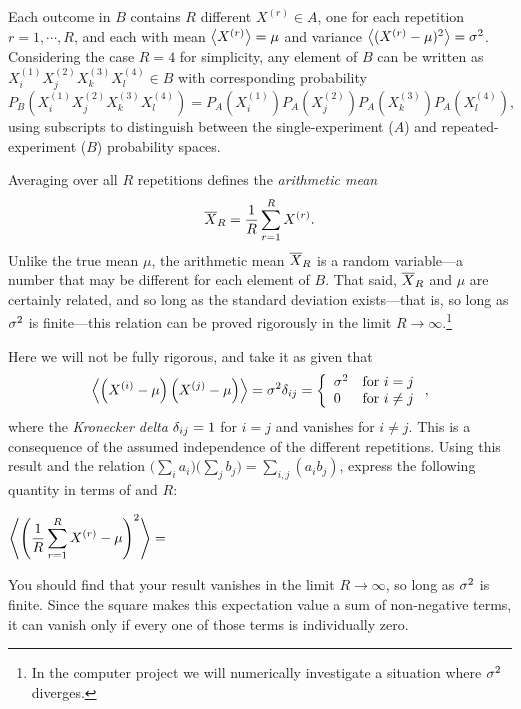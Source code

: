 Each outcome in $B$ contains $R$ different $X^{(r)} \in A$, one for each repetition $r = 1, \cdots, R$, and each with mean $\left\langle X^{(r)} \right\rangle = \mu$ and variance $\left\langle (X^{(r)} - \mu)^2 \right\rangle = \sigma^2$.
Considering the case $R = 4$ for simplicity, any element of $B$ can be written as $X_i^{(1)} X_j^{(2)} X_k^{(3)} X_l^{(4)} \in B$ with corresponding probability
\begin{equation*}
  P_B\left(X_i^{(1)} X_j^{(2)} X_k^{(3)} X_l^{(4)}\right) = P_A\left(X_i^{(1)}\right) P_A\left(X_j^{(2)}\right) P_A\left(X_k^{(3)}\right) P_A\left(X_l^{(4)}\right),
\end{equation*}
using subscripts to distinguish between the single-experiment ($A$) and repeated-experiment ($B$) probability spaces.

Averaging over all $R$ repetitions defines the \textit{arithmetic mean}
\begin{equation}
  \label{eq:ave}
  \overline X_R = \frac{1}{R} \sum_{r = 1}^R X^{(r)}.
\end{equation}
Unlike the true mean $\mu$, the arithmetic mean $\overline X_R$ is a random variable---a number that may be different for each element of $B$.
That said, $\overline X_R$ and $\mu$ are certainly related, and so long as the standard deviation exists---that is, so long as $\sigma^2$ is finite---this relation can be proved rigorously in the limit $R \to \infty$.\footnote{In the computer project we will numerically investigate a situation where $\sigma^2$ diverges.}

Here we will not be fully rigorous, and take it as given that
\begin{equation*}
  \left\langle \left(X^{(i)} - \mu\right)\left(X^{(j)} - \mu\right) \right\rangle = \sigma^2 \delta_{ij} = \left\{\begin{array}{ll}\sigma^2 & \mbox{for } i = j \\ 0 & \mbox{for } i \ne j\end{array}\right.,
\end{equation*}
where the \textit{Kronecker delta} $\delta_{ij} = 1$ for $i = j$ and vanishes for $i \ne j$.
This is a consequence of the assumed independence of the different repetitions.
Using this result and the relation $\big(\sum_i a_i\big)\big(\sum_j b_j\big) = \sum_{i, j} \left(a_i b_j\right)$, express the following quantity in terms of \si and $R$:
\begin{mdframed}
  $\displaystyle \left\langle \left(\frac{1}{R} \sum_{r = 1}^R X^{(r)} - \mu\right)^2 \right\rangle = $ \\[100 pt] %
\end{mdframed}
You should find that your result vanishes in the limit $R \to \infty$, so long as $\sigma^2$ is finite.
Since the square makes this expectation value a sum of non-negative terms, it can vanish only if every one of those terms is individually zero.

